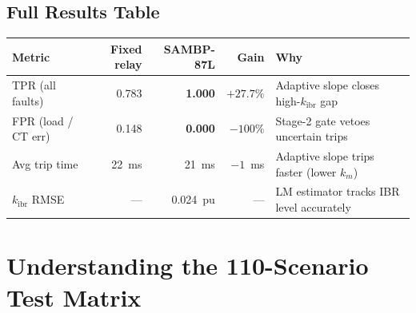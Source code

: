 \documentclass[12pt,a4paper]{article}
\newcommand{\kibr}{k_\mathrm{ibr}}
\begin{document}
\subsection{Full Results Table}

\begin{center}
\begin{tabular}{@{}lrrrl@{}}
\toprule
\textbf{Metric} & \textbf{Fixed relay} & \textbf{SAMBP-87L} & \textbf{Gain} & \textbf{Why} \\
\midrule
TPR (all faults)     & 0.783 & \textbf{1.000} & $+27.7\%$ & Adaptive slope closes high-$\kibr$ gap \\
FPR (load / CT err)  & 0.148 & \textbf{0.000} & $-100\%$  & Stage-2 gate vetoes uncertain trips \\
Avg trip time        & 22~ms & 21~ms          & $-1$~ms   & Adaptive slope trips faster (lower $k_m$) \\
$\kibr$ RMSE         & ---   & 0.024~pu       & ---       & LM estimator tracks IBR level accurately \\
\bottomrule
\end{tabular}
\end{center}

\section{Understanding the 110-Scenario Test Matrix}
\end{document}
